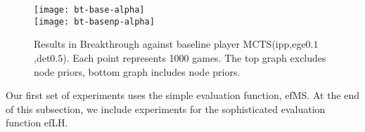 \documentclass{article}
\newcommand{\Update}{{\sc Update}}
\begin{document}

\begin{figure}[t]
\begin{center}
\texttt{[image: bt-base-alpha]}\\
\texttt{[image: bt-basenp-alpha]}
\caption{Results in Breakthrough against 
baseline player MCTS(ipp,ege$0.1$,det$0.5$).  
Each point represents 1000 games. The top graph excludes node priors, bottom graph includes node priors.} 
\label{fig:bt-base-alpha}
\end{center}
\end{figure}

Our first set of experiments uses the simple evaluation function, efMS. At the end of this subsection, we 
include experiments for the sophisticated evaluation function efLH.
\end{document}
